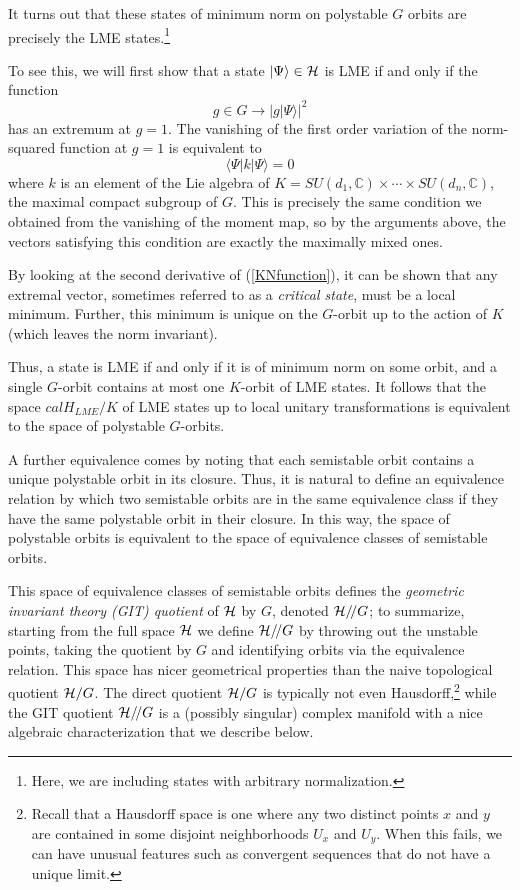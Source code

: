 \documentclass[12pt]{article}
\theoremstyle{definition}
\newcommand{\be}{\begin{equation}}
\newcommand{\ee}{\end{equation}}
\newcommand{\GITquot}{/\!/}
\begin{document}
It turns out that these states of minimum norm on polystable $G$ orbits are precisely the LME states.\footnote{Here, we are including states with arbitrary normalization.}

To see this, we will first show that a state $|\Psi \rangle \in {\cal H}$ is LME if and only if the function
\be
\label{KNfunction}
g \in G \to |g |\Psi \rangle|^2
\ee
has an extremum at $g=1$. The vanishing of the first order variation of the norm-squared function at $g=1$ is equivalent to
\be
\langle \Psi| k |\Psi \rangle = 0
\ee
where $k$ is an element of the Lie algebra of $K = SU(d_1,\mathbb{C}) \times \cdots \times SU(d_n, \mathbb{C})$, the maximal compact subgroup of $G$. This is precisely the same condition we obtained from the vanishing of the moment map, so by the arguments above, the vectors satisfying this condition are exactly the maximally mixed ones.

By looking at the second derivative of (\ref{KNfunction}), it can be shown that any extremal vector, sometimes referred to as a {\it critical state}, must be a local minimum.  Further, this minimum is unique on the $G$-orbit up to the action of $K$ (which leaves the norm invariant).

Thus, a state is LME if and only if it is of minimum norm on some orbit, and a single $G$-orbit contains at most one $K$-orbit of LME states. It follows that the space ${cal H}_{LME}/K$ of LME states up to local unitary transformations is equivalent to the space of polystable $G$-orbits.

A further equivalence comes by noting that each semistable orbit contains a unique polystable orbit in its closure. Thus, it is natural to define an equivalence relation by which two semistable orbits are in the same equivalence class if they have the same polystable orbit in their closure. In this way, the space of polystable orbits is equivalent to the space of equivalence classes of semistable orbits.

This space of equivalence classes of semistable orbits defines the {\it geometric invariant theory (GIT) quotient} of ${\cal H}$ by $G$, denoted ${\cal H}\GITquot G$; to summarize, starting from the full space ${\cal H}$ we define ${\cal H}\GITquot G$ by throwing out the unstable points, taking the quotient by $G$ and identifying orbits via the equivalence relation. This space has nicer geometrical properties than the naive topological quotient ${\cal H}/G$. The direct quotient ${\cal H}/G$ is typically not even Hausdorff,\footnote{Recall that a Hausdorff space is one where any two distinct points $x$ and $y$ are contained in some disjoint neighborhoods $U_x$ and $U_y$. When this fails, we can have unusual features such as convergent sequences that do not have a unique limit.} while the GIT quotient ${\cal H}\GITquot G$ is a (possibly singular) complex manifold with a nice algebraic characterization that we describe below.
\end{document}
